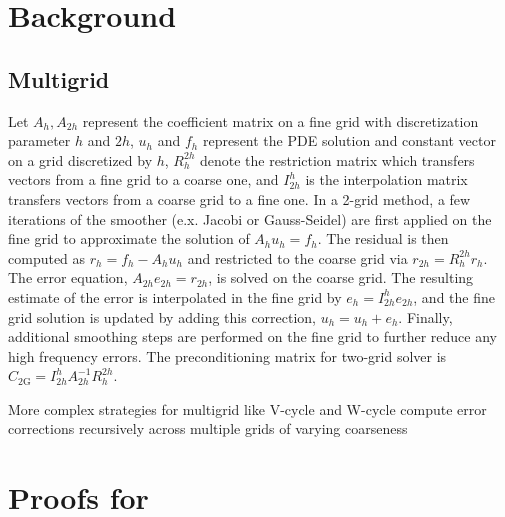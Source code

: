 \documentclass{article} %
\begin{document}










\appendix
\section{Background} \label{sec:appbackground}

\subsection{Multigrid} \label{sec:multigrid}

Let $A_h, A_{2h}$ represent the coefficient matrix on a fine grid with discretization parameter $h$ and $2h$, $u_h$ and $f_h$ represent the PDE solution and constant vector on a grid discretized by $h$, $R^{2h}_h$ denote the restriction matrix which transfers vectors from a fine grid to a coarse one, and $I^{h}_{2h}$ is the interpolation matrix transfers vectors from a coarse grid to a fine one. In a 2-grid method, a few iterations of the smoother (e.x. Jacobi or Gauss-Seidel) are first applied on the fine grid to approximate the solution of $A_hu_h = f_h$. The residual is then computed as $r_h = f_h - A_hu_h$ and restricted to the coarse grid via $r_{2h} = R^{2h}_hr_h$. The error equation, $A_{2h}e_{2h} = r_{2h}$, is solved on the coarse grid. The resulting estimate of the error is interpolated in the fine grid by $e_h = I^{h}_{2h}e_{2h}$, and the fine grid solution is updated by adding this correction, $u_h = u_h + e_h$. Finally, additional smoothing steps are performed on the fine grid to further reduce any high frequency errors. The preconditioning matrix for two-grid solver is $C_\mathrm{2G} = I^{h}_{2h}A_{2h}^{-1}R^{2h}_h$.

More complex strategies for multigrid like V-cycle and W-cycle compute error corrections recursively across multiple grids of varying coarseness %

\section{Proofs for } \label{sec:proofgreedy}
\end{document}

